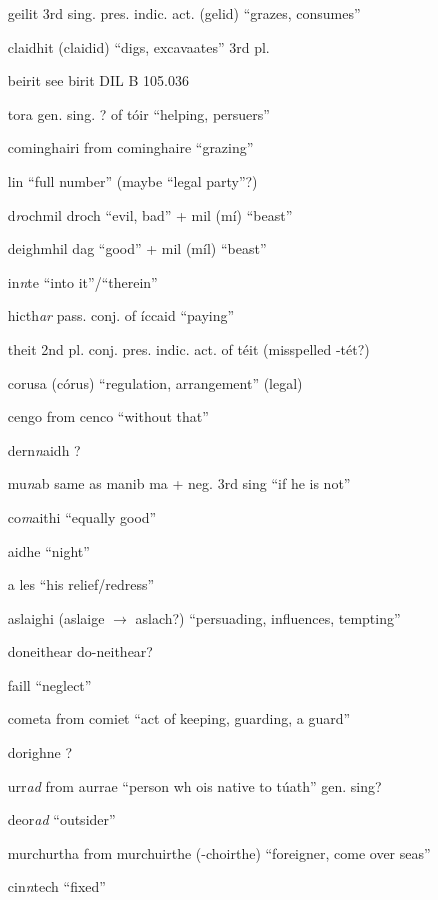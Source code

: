\documentclass[11pt]{article}
\begin{document}
\begin{enumerate}
  \item[geilit] 3rd sing. pres. indic. act. (gelid) \enquote{grazes, consumes}
  \item[claidhit] (claidid) \enquote{digs, excavaates} 3rd pl.
  \item[beirit] see birit DIL B 105.036
  \item[tora] gen. sing. ? of t\'{o}ir \enquote{helping, persuers}
  \item[cominghairi] from cominghaire \enquote{grazing}
  \item[lin] \enquote{full number} (maybe \enquote{legal party}?)
  \item[d\emph{r}ochmil] droch \enquote{evil, bad} + mil (m\'{i}) \enquote{beast}
  \item[deighmhil] dag \enquote{good} + mil (m\'{i}l) \enquote{beast}
  \item[in\emph{n}te] \enquote{into it}/\enquote{therein}
  \item[hicth\emph{ar}] pass. conj. of \'{i}ccaid \enquote{paying}
  \item[theit] 2nd pl. conj. pres. indic. act. of t\'{e}it (misspelled -t\'{e}t?)
  \item[corusa] (c\'{o}rus) \enquote{regulation, arrangement} (legal)
  \item[cengo] from cenco \enquote{without that}
  \item[dern\emph{n}aidh] ?
  \item[mu\emph{n}ab] same as manib ma + neg. 3rd sing \enquote{if he is not}
  \item[co\emph{m}aithi] \enquote{equally good}
  \item[aidhe] \enquote{night}
  \item[a les] \enquote{his relief/redress}
  \item[aslaighi] (aslaige $\rightarrow$ aslach?) \enquote{persuading, influences, tempting}
  \item[doneithear] do-neithear?
  \item[faill] \enquote{neglect}
  \item[cometa] from comi{e}t \enquote{act of keeping, guarding, a guard}
  \item[dorighne] ?
  \item[urr\emph{ad}] from aurrae \enquote{person wh ois native to t\'{u}ath} gen. sing? 
  \item[deor\emph{ad}] \enquote{outsider} 
  \item[murchurtha] from murchuirthe (-choirthe) \enquote{foreigner, come over seas} 
  \item[cin\emph{n}tech] \enquote{fixed}

\end{enumerate}
\end{document}
